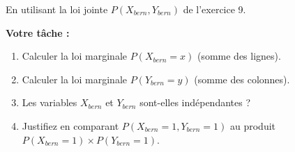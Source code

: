 \begin{exercicebox}
En utilisant la loi jointe $P(X_{bern}, Y_{bern})$ de l'exercice 9.

\textbf{Votre tâche :}
\begin{enumerate}
    \item Calculer la loi marginale $P(X_{bern}=x)$ (somme des lignes).
    \item Calculer la loi marginale $P(Y_{bern}=y)$ (somme des colonnes).
    \item Les variables $X_{bern}$ et $Y_{bern}$ sont-elles indépendantes ? 
    \item Justifiez en comparant $P(X_{bern}=1, Y_{bern}=1)$ au produit $P(X_{bern}=1) \times P(Y_{bern}=1)$.
\end{enumerate}
\end{exercicebox}